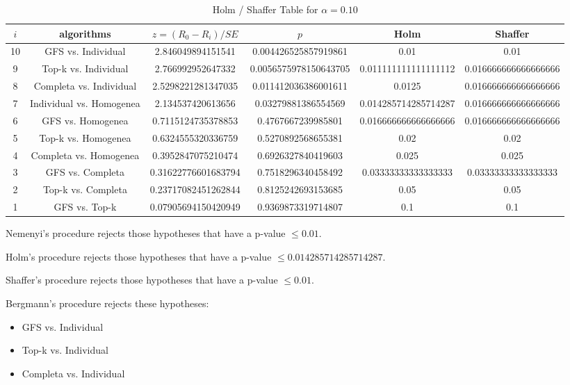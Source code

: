 \documentclass[a4paper,10pt]{article}
\begin{document}
\begin{landscape}
\begin{table}[!htp]
\centering\tiny
\caption{Holm / Shaffer Table for $\alpha=0.10$}
\begin{tabular}{cccccc}
$i$&algorithms&$z=(R_0 - R_i)/SE$&$p$&Holm&Shaffer\\
\hline
10&GFS vs. Individual&2.846049894151541&0.004426525857919861&0.01&0.01\\
9&Top-k vs. Individual&2.766992952647332&0.0056575978150643705&0.011111111111111112&0.016666666666666666\\
8&Completa vs. Individual&2.5298221281347035&0.011412036386001611&0.0125&0.016666666666666666\\
7&Individual vs. Homogenea&2.134537420613656&0.03279881386554569&0.014285714285714287&0.016666666666666666\\
6&GFS vs. Homogenea&0.7115124735378853&0.4767667239985801&0.016666666666666666&0.016666666666666666\\
5&Top-k vs. Homogenea&0.6324555320336759&0.5270892568655381&0.02&0.02\\
4&Completa vs. Homogenea&0.3952847075210474&0.6926327840419603&0.025&0.025\\
3&GFS vs. Completa&0.31622776601683794&0.7518296340458492&0.03333333333333333&0.03333333333333333\\
2&Top-k vs. Completa&0.23717082451262844&0.8125242693153685&0.05&0.05\\
1&GFS vs. Top-k&0.07905694150420949&0.9369873319714807&0.1&0.1\\
\hline
\end{tabular}
\end{table}
Nemenyi's procedure rejects those hypotheses that have a p-value $\le0.01$.


Holm's procedure rejects those hypotheses that have a p-value $\le0.014285714285714287$.


Shaffer's procedure rejects those hypotheses that have a p-value $\le0.01$.


Bergmann's procedure rejects these hypotheses:


\begin{itemize}


\item GFS vs. Individual
\item Top-k vs. Individual
\item Completa vs. Individual
\end{itemize}



\end{landscape}
\end{document}
